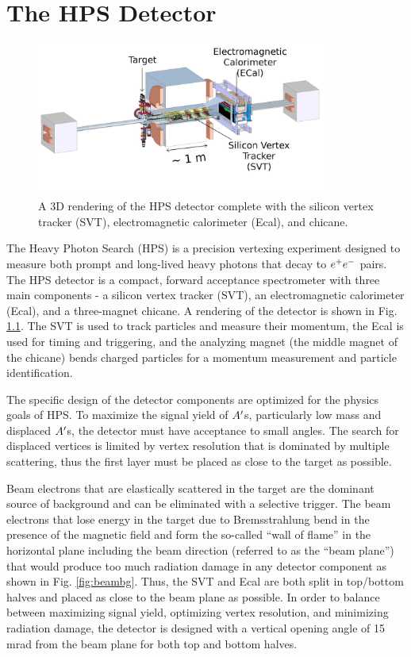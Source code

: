 \chapter{The HPS Detector}\label{chap:detector}

\begin{figure}
    \centering
    \includegraphics[width=0.85\textwidth]{figs/detector/detector.png}
    \caption{A 3D rendering of the HPS detector complete with the silicon vertex tracker (SVT), electromagnetic calorimeter (Ecal), and chicane.}
    \label{fig:detector}
\end{figure}

The Heavy Photon Search (HPS) is a precision vertexing experiment designed to measure both prompt and long-lived heavy photons that decay to $e^{+}e^{-}$ pairs. The HPS detector is a compact, forward acceptance spectrometer with three main components - a silicon vertex tracker (SVT), an electromagnetic calorimeter (Ecal), and a three-magnet chicane. A rendering of the detector is shown in Fig. \ref{fig:detector}. The SVT is used to track particles and measure their  momentum, the Ecal is used for timing and triggering, and the analyzing magnet (the middle magnet of the chicane) bends charged particles for a momentum measurement and particle identification. 

The specific design of the detector components are optimized for the physics goals of HPS. To maximize the signal yield of $A^\prime$s, particularly low mass and displaced $A^\prime$s, the detector must have acceptance to small angles. The search for displaced vertices is limited by vertex resolution that is dominated by multiple scattering, thus the first layer must be placed as close to the target as possible.

Beam electrons that are elastically scattered in the target are the dominant source of background and can be eliminated with a selective trigger. The beam electrons that lose energy in the target due to Bremsstrahlung bend in the presence of the magnetic field and form the so-called ``wall of flame'' in the horizontal plane including the beam direction (referred to as the ``beam plane'') that would produce too much radiation damage in any detector component as shown in Fig. \ref{fig:beambg}. Thus, the SVT and Ecal are both split in top/bottom halves and placed as close to the beam plane as possible. In order to balance between maximizing signal yield, optimizing vertex resolution, and minimizing radiation damage, the detector is designed with a vertical opening angle of 15 mrad from the beam plane for both top and bottom halves.

